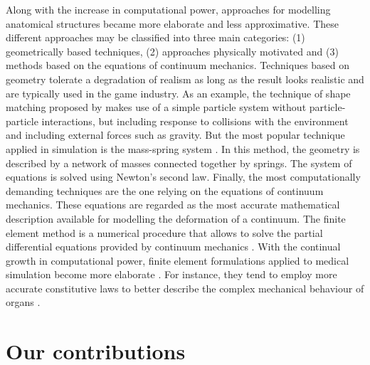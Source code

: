 \bigskip

Along with the increase in computational power, approaches for modelling anatomical structures became more elaborate and less approximative. These different approaches may be classified into three main categories: (1) geometrically based techniques, (2) approaches physically motivated and (3) methods based on the equations of continuum mechanics. Techniques based on geometry tolerate a degradation of realism as long as the result looks realistic and are typically used in the game industry. As an example, the technique of shape matching proposed by \cite{Muller05} makes use of a simple particle system without particle-particle interactions, but including response to collisions with the environment and including external forces such as gravity. But the most popular technique applied in simulation is the mass-spring system \citep{Terzopoulos91,Provot95,Mosegaard05b} . In this method, the geometry is described by a network of masses connected together by springs. The system of equations is solved using Newton's second law. Finally, the most computationally demanding techniques are the one relying on the equations of continuum mechanics. These equations are regarded as the most accurate mathematical description available for modelling the deformation of a continuum. The finite element method is a numerical procedure that allows to solve the partial differential equations provided by continuum mechanics \citep{Cotin99}. With the continual growth in computational power, finite element formulations applied to medical simulation become more elaborate \citep{Sagar94,Felippa00,Debunne01,Miller07}. For instance, they tend to employ more accurate constitutive laws to better describe the complex mechanical behaviour of organs \citep{Fung93}. 


\section{Our contributions}

